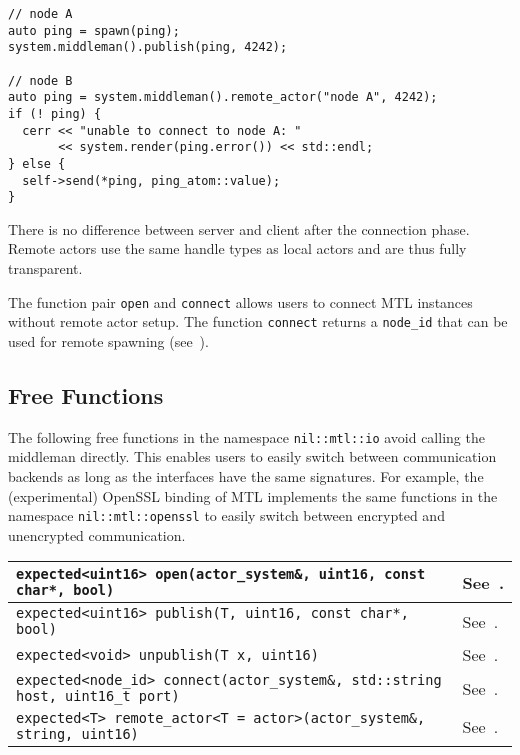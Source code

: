 \begin{lstlisting}
// node A
auto ping = spawn(ping);
system.middleman().publish(ping, 4242);

// node B
auto ping = system.middleman().remote_actor("node A", 4242);
if (! ping) {
  cerr << "unable to connect to node A: "
       << system.render(ping.error()) << std::endl;
} else {
  self->send(*ping, ping_atom::value);
}
\end{lstlisting}

There is no difference between server and client after the connection phase.
Remote actors use the same handle types as local actors and are thus fully
transparent.

The function pair \lstinline^open^ and \lstinline^connect^ allows users to
connect MTL instances without remote actor setup. The function
\lstinline^connect^ returns a \lstinline^node_id^ that can be used for remote
spawning (see~).

\subsection{Free Functions}
\label{free-remoting-functions}

The following free functions in the namespace \lstinline^nil::mtl::io^ avoid calling
the middleman directly. This enables users to easily switch between
communication backends as long as the interfaces have the same signatures. For
example, the (experimental) OpenSSL binding of MTL implements the same
functions in the namespace \lstinline^nil::mtl::openssl^ to easily switch between
encrypted and unencrypted communication.

\begin{center}
\begin{tabular}{ll}
  \hline
  \lstinline^expected<uint16> open(actor_system&, uint16, const char*, bool)^ & See~. \\
  \hline
  \lstinline^expected<uint16> publish(T, uint16, const char*, bool)^ & See~. \\
  \hline
  \lstinline^expected<void> unpublish(T x, uint16)^ & See~. \\
  \hline
  \lstinline^expected<node_id> connect(actor_system&, std::string host, uint16_t port)^ & See~. \\
  \hline
  \lstinline^expected<T> remote_actor<T = actor>(actor_system&, string, uint16)^ & See~. \\
  \hline
\end{tabular}
\end{center}

